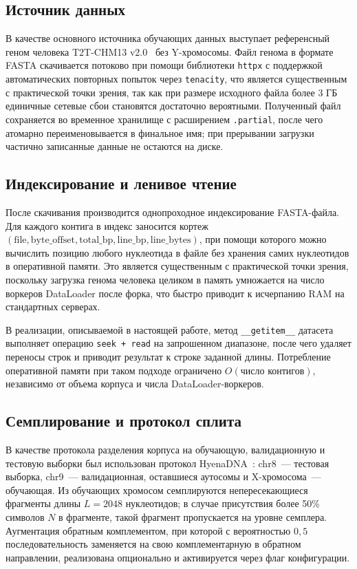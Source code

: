 \subsection{Источник данных}

В качестве основного источника обучающих данных выступает референсный
геном человека T2T-CHM13
v2.0~\cite{nurgalievT2TCHm13CompleteHuman2022} без Y-хромосомы. Файл
генома в формате FASTA скачивается потоково при помощи библиотеки
\texttt{httpx} с поддержкой автоматических повторных попыток через
\texttt{tenacity}, что является существенным с практической точки
зрения, так как при размере исходного файла более 3 ГБ единичные
сетевые сбои становятся достаточно вероятными. Полученный файл
сохраняется во временное хранилище с расширением \texttt{.partial},
после чего атомарно переименовывается в финальное имя; при прерывании
загрузки частично записанные данные не остаются на диске.

\subsection{Индексирование и ленивое чтение}

После скачивания производится однопроходное индексирование
FASTA-файла. Для каждого контига в индекс заносится кортеж $(\text{file},
\text{byte\_offset}, \text{total\_bp}, \text{line\_bp},
\text{line\_bytes})$, при помощи которого можно вычислить позицию
любого нуклеотида в файле без хранения самих нуклеотидов в
оперативной памяти. Это является существенным с практической точки
зрения, поскольку загрузка генома человека целиком в память умножается
на число воркеров DataLoader после форка, что быстро приводит к
исчерпанию RAM на стандартных серверах.

В реализации, описываемой в настоящей работе, метод
\texttt{\_\_getitem\_\_} датасета выполняет операцию \texttt{seek + read}
на запрошенном диапазоне, после чего удаляет переносы строк и приводит
результат к строке заданной длины. Потребление оперативной памяти при
таком подходе ограничено $O(\text{число контигов})$, независимо от
объема корпуса и числа DataLoader-воркеров.

\subsection{Семплирование и протокол сплита}

В качестве протокола разделения корпуса на обучающую, валидационную и
тестовую выборки был использован протокол
HyenaDNA~\cite{nguenHyenaDNALongRangeGenomic2024}: chr8~--- тестовая
выборка, chr9~--- валидационная, оставшиеся аутосомы и X-хромосома~---
обучающая. Из обучающих хромосом семплируются непересекающиеся
фрагменты длины $L = 2048$ нуклеотидов; в случае присутствия более
50\% символов $N$ в фрагменте, такой фрагмент пропускается на уровне
семплера. Аугментация обратным комплементом, при которой с
вероятностью $0{,}5$ последовательность заменяется на свою
комплементарную в обратном направлении, реализована опционально и
активируется через флаг конфигурации.

